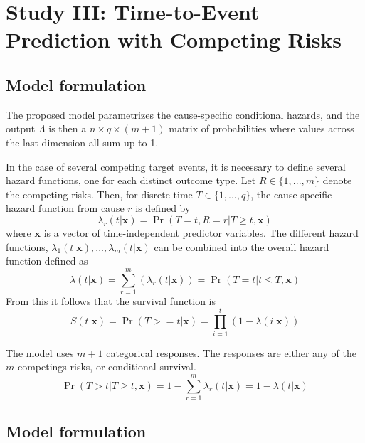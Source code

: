 \chapter{Study III: Time-to-Event Prediction with Competing Risks}
\label{chap:study3-outline}

\section{Model formulation}

The proposed model parametrizes the cause-specific conditional hazards,
and the output \(\Lambda\) is then a 
\(n \times q \times (m + 1)\) matrix of probabilities
where values across the last dimension all sum up to 1.


In the case of several competing target events,
it is necessary to define several hazard functions,
one for each distinct outcome type.
Let \(R \in \{1, ..., m\}\) denote the competing risks.
Then, for disrete time \(T \in \{1, ..., q\}\), 
the cause-specific hazard function from cause $r$ is defined by
%
\begin{equation*}
    \lambda_{r}(t | \mathbf{x}) = \Pr (T = t, R = r | T \geq t, \mathbf{x})
\end{equation*}
%
where \(\mathbf{x}\) is a vector of time-independent predictor variables. 
The different hazard functions, 
\(\lambda_{1}(t|\mathbf{x}), ..., \lambda_{m}(t|\mathbf{x})\) 
can be combined into the overall hazard function defined as
%
\begin{equation}
    \lambda(t|\mathbf{x}) 
    = \sum_{r=1}^{m}(\lambda_{r}(t|\mathbf{x}))
    = \Pr(T = t | t \leq T, \mathbf{x})
\end{equation}
%
From this it follows that the survival function is
%
\begin{equation}
    S(t|\mathbf{x})
    = \Pr(T >= t|\mathbf{x})
    = \prod_{i=1}^{t}(1 - \lambda(i|\mathbf{x}))
\end{equation}

The model uses $m + 1$ categorical responses.
The responses are either any of the $m$ competings risks, 
or conditional survival.
%
\begin{equation}
    \Pr(T > t | T \geq t, \mathbf{x})
    = 1 - \sum_{r = 1}^{m} \lambda_r (t | \mathbf{x})
    = 1 - \lambda (t | \mathbf{x})
\end{equation}

\section{Model formulation}

